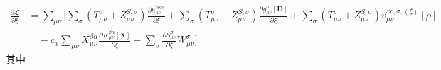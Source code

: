 \documentclass[11pt]{ctexart}
\numberwithin{equation}{section}
\begin{document}
\begin{equation}
    \begin{aligned}
        \frac{\partial\mathcal{L}}{\partial\xi} 
        &= \sum_{\mu\nu}\Bigg[
            \sum_{\sigma}(T_{\mu\nu}^{\sigma}+Z_{\mu\nu}^{S,\sigma})\frac{\partial h_{\mu\nu}^{core}}{\partial\xi}
            + \sum_{\sigma}(T_{\mu\nu}^{\sigma}+Z_{\mu\nu}^{S,\sigma})\frac{\partial g_{\mu\nu}^{\sigma}[\mathbf{D}]}{\partial\xi}
            +\sum_{\sigma}(T_{\mu\nu}^{\sigma}+Z_{\mu\nu}^{S,\sigma})v_{\mu\nu}^{xc,\sigma,(\xi)}[\rho]\\
            &\quad - c_x\sum_{\mu\nu}X_{\mu\nu}^{\beta\alpha}\frac{\partial K_{\mu\nu}^{\beta\alpha}[\mathbf{X}]}{\partial\xi}
            - \sum_{\sigma}\frac{\partial S_{\mu\nu}^{\sigma}}{\partial\xi} W_{\mu\nu}^{\sigma}
        \Bigg]
    \end{aligned}
\end{equation}
其中
\end{document}
